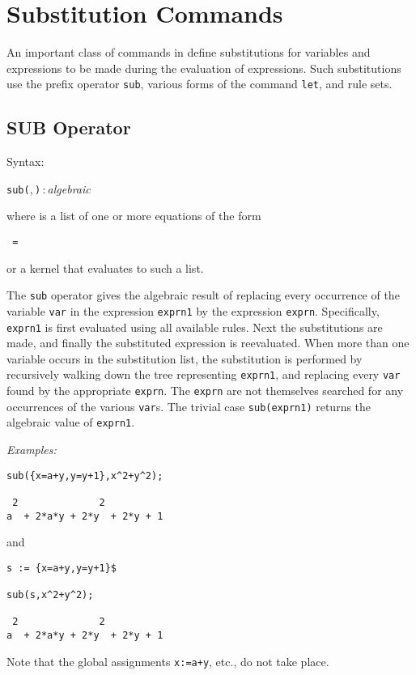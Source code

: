 \chapter{Substitution Commands}

\label{chapter:subst}

An important class of commands in {\REDUCE} define
substitutions for variables and expressions to be made during the
evaluation of expressions.  Such substitutions use the prefix operator
\texttt{sub}, various forms of the command \texttt{let}, and rule sets.

\section{SUB Operator}
\hypertarget{operator:SUB}{}

Syntax:
\begin{syntax}
  \texttt{sub(},\,\texttt{)}\,:\,\textit{algebraic}
\end{syntax}
where  is a list of one or more equations of the
form
\begin{syntax}
  \texttt{ = }
\end{syntax}
or a kernel that evaluates to such a list.

The \texttt{sub} operator gives the algebraic result of replacing every
occurrence of the variable \texttt{var} in the expression \texttt{exprn1} by the
expression \texttt{exprn}.  Specifically, \texttt{exprn1} is first evaluated
using all available rules.  Next the substitutions are made, and finally
the substituted expression is reevaluated.  When more than one variable
occurs in the substitution list, the substitution is performed by
recursively walking down the tree representing \texttt{exprn1}, and replacing
every \texttt{var} found by the appropriate \texttt{exprn}.  The \texttt{exprn} are
not themselves searched for any occurrences of the various \texttt{var}s.
The trivial case \texttt{sub(exprn1)} returns the algebraic value of
\texttt{exprn1}.

\textit{Examples:}
\begin{verbatim}
sub({x=a+y,y=y+1},x^2+y^2);

 2              2
a  + 2*a*y + 2*y  + 2*y + 1
\end{verbatim}
and
\begin{verbatim}
s := {x=a+y,y=y+1}$

sub(s,x^2+y^2);

 2              2
a  + 2*a*y + 2*y  + 2*y + 1
\end{verbatim}
Note that the global assignments \texttt{x:=a+y}, etc., do not take place.

